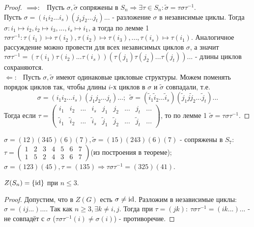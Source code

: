 \begin{proof}
    $ \\ \Longrightarrow: \ \ $ Пусть $\sigma, \tilde{\sigma}$ сопряжены в $S_n \Longrightarrow \exists \tau \in S_n: \tilde{\sigma} = \tau \sigma \tau^{-1}$.\\
    Пусть $\sigma = (i_1i_2...i_s)(j_1j_2...j_t)...$ - разложение $\sigma$ в независимые циклы. Тогда $\sigma: i_1 \mapsto i_2, i_2 \mapsto i_3,..., i_s \mapsto i_1$, а тогда по лемме 1 $\tau\sigma\tau^{-1}: \tau(i_1) \mapsto \tau(i_2), \tau(i_2) \mapsto \tau(i_3),..., \tau(i_s) \mapsto \tau(i_1)$. Аналогичное рассуждение можно провести для всех независимых циклов $\sigma$, а значит $\tau\sigma\tau^{-1} = (\tau(i_1)\tau(i_2)...\tau(i_s))(\tau(j_1)\tau(j_2)...\tau(j_t))...$ - длины циклов сохраняются.\\
    $\Longleftarrow: \ \ $ Пусть $\sigma, \tilde{\sigma}$ имеют одинаковые цикловые структуры. Можем поменять порядок циклов так, чтобы длины $i$-х циклов в $\sigma$ и $\tilde{\sigma}$ совпадали, т.е.
    \[\sigma = (i_1i_2...i_s)(j_1j_2...j_t)...; \ \ \tilde{\sigma} = (\tilde{i}_1\tilde{i}_2...\tilde{i}_s)(\tilde{j}_1j\tilde{j}_2...\tilde{j}_t)...\]
    Тогда если $\tau = \begin{pmatrix} i_1&i_2&...&i_s&j_1&j_2&...&j_t&...\\ \tilde{i}_1&\tilde{i}_2&...&\tilde{i}_s&\tilde{j}_1&\tilde{j}_2&...&\tilde{j}_t&... \end{pmatrix}$, то по лемме 1 $\tilde{\sigma} = \tau \sigma \tau^{-1}$.  
\end{proof}
\begin{examples}
    $\sigma = (12)(345)(6)(7), \tilde{\sigma} = (15)(243)(6)(7)$ - сопряжены в $S_7$:\\$\tau = \begin{pmatrix} 1&2&3&4&5&6&7\\1&5&2&4&3&6&7  \end{pmatrix}$(из построения в теореме);\\
    $\sigma = (123)(45), \tau = (135) \Longrightarrow \tau\sigma\tau^{-1} = (325)(41)$.
\end{examples}
\begin{consequense}
    $Z(S_n) = \{\textup{id}\}$ при $n \leqslant 3$.
\end{consequense}
\begin{proof}
    Допустим, что в $Z(G)$ есть $\sigma \neq \textup{id}$. Разложим в независимые циклы: $\sigma = (ij...)...$. Так как $n \geqslant 3, \exists k \neq i, j$. Тогда при $\tau = (jk): \ \tau\sigma\tau^{-1} = (ik...)...$ - не совпадёт с $\sigma$ ($\tau\sigma\tau^{-1}(i) \neq \sigma(i)$) - противоречие.  
\end{proof}
